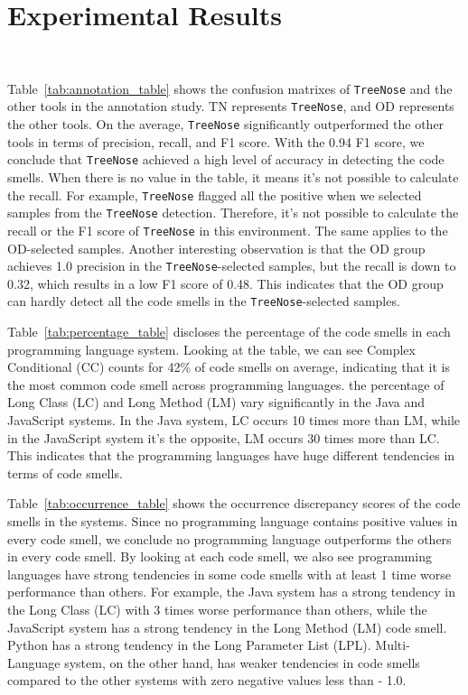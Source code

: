 

\vspace*{-1em}

\section{Experimental Results}~\label{sec:results}

\vspace*{-1em}


Table~\ref{tab:annotation_table} shows the confusion matrixes of
\texttt{TreeNose} and the other tools in the annotation study. TN represents
\texttt{TreeNose}, and OD represents the other tools. On the average,
\texttt{TreeNose} significantly outperformed the other tools in terms of
precision, recall, and F1 score. With the 0.94 F1 score, we conclude that
\texttt{TreeNose} achieved a high level of accuracy in detecting the code
smells. When there is no value in the table, it means it's not possible to
calculate the recall. For example, \texttt{TreeNose} flagged all the positive
when we selected samples from the \texttt{TreeNose} detection. Therefore, it's
not possible to calculate the recall or the F1 score of \texttt{TreeNose} in
this environment. The same applies to the OD-selected samples. Another
interesting observation is that the OD group achieves 1.0 precision in the
\texttt{TreeNose}-selected samples, but the recall is down to 0.32, which
results in a low F1 score of 0.48. This indicates that the OD group can hardly
detect all the code smells in the \texttt{TreeNose}-selected samples.

Table~\ref{tab:percentage_table} discloses the percentage of the code smells in
each programming language system. Looking at the table, we can see Complex
Conditional (CC) counts for 42\% of code smells on average, indicating that it
is the most common code smell across programming languages. the percentage of
Long Class (LC) and Long Method (LM) vary significantly in the Java and
JavaScript systems. In the Java system, LC occurs 10 times more than LM, while
in the JavaScript system it's the opposite, LM occurs 30 times more than LC.
This indicates that the programming languages have huge different tendencies in
terms of code smells.



Table~\ref{tab:occurrence_table} shows the occurrence discrepancy scores of the
code smells in the systems. Since no programming language contains positive
values in every code smell, we conclude no programming language outperforms the
others in every code smell. By looking at each code smell, we also see
programming languages have strong tendencies in some code smells with at least
1 time worse performance than others. For example, the Java system has a strong
tendency in the Long Class (LC) with 3 times worse performance than others,
while the JavaScript system has a strong tendency in the Long Method (LM) code
smell. Python has a strong tendency in the Long Parameter List (LPL).
Multi-Language system, on the other hand, has weaker tendencies in code smells
compared to the other systems with zero negative values less than - 1.0.
